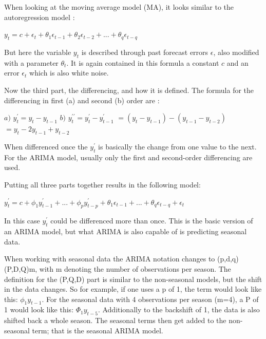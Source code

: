 When looking at the moving average model (MA), it looks similar to the autoregression model \cite{forecasting}:
\begin{displayquote}
	$y_t = c+\epsilon_t+\theta_1\epsilon_{t-1}+\theta_2\epsilon_{t-2}+...+\theta_q\epsilon_{t-q}$
\end{displayquote}
But here the variable $y_t$ is described through past forecast errors $\epsilon$, also modified with a parameter $\theta_t$.
It is again contained in this formula a constant $c$ and an error $\epsilon_t$ which is also white noise.

Now the third part, the differencing, and how it is defined.
The formula for the differencing in first (a) and second (b) order are \cite{forecasting}:
\begin{samepage}
\begin{displayquote}
	\begin{flushleft}
		$a)$\linebreak
		${y}_{t}^{\prime }=y_t-y_{t-1}$\linebreak
		\linebreak
		$b)$\linebreak
		${y}_{t}^{\prime\prime}=y_t^{\prime}-y_{t-1}^{\prime}$\linebreak
		$=(y_t-y_{t-1})-(y_{t-1}-y_{t-2})$\linebreak
		$=y_t-2y_{t-1}+y_{t-2}$
	\end{flushleft}
\end{displayquote}
\end{samepage}
When differenced once the ${y}_{t}^{\prime}$ is basically the change from one value to the next.
For the ARIMA model, usually only the first and second-order differencing are used.

Putting all three parts together results in the following model:
\begin{displayquote}
	$y_t^{\prime} = c+\phi_1y_{t-1}^{\prime}+...+\phi_p y_{t-p}^{\prime}+\theta_1\epsilon_{t-1}+...+\theta_q\epsilon_{t-q}+\epsilon_t$
\end{displayquote}
In this case $y_t^{\prime}$ could be differenced more than once.        
This is the basic version of an ARIMA model, but what ARIMA is also capable of is predicting seasonal data. 

When working with seasonal data the ARIMA notation changes to (p,d,q) (P,D,Q)m, with m denoting the number of observations per season.
The definition for the (P,Q,D) part is similar to the non-seasonal models, but the shift in the data changes.
So for example, if one uses a p of 1, the term would look like this: $\phi_1y_{t-1}$.
For the seasonal data with 4 observations per season (m=4), a P of 1 would look like this: $\Phi_1y_{t-5}$.
Additionally to the backshift of 1, the data is also shifted back a whole season.
The seasonal terms then get added to the non-seasonal term; that is the seasonal ARIMA model.

